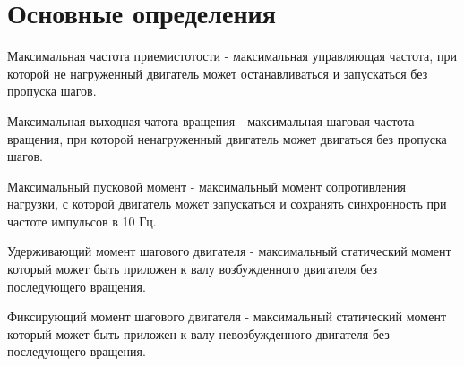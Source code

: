 \newpage
\part{ Основные определения }

Максимальная частота приемистотости - максимальная управляющая частота, при которой не нагруженный
двигатель может останавливаться и запускаться без пропуска шагов.

Максимальная выходная чатота вращения - максимальная шаговая частота вращения, при которой
ненагруженный двигатель может двигаться без пропуска шагов.

Максимальный пусковой момент - максимальный момент сопротивления нагрузки, с которой двигатель может
запускаться и сохранять синхронность при частоте импульсов в 10 Гц.

Удерживающий момент шагового двигателя - максимальный статический момент который может быть приложен
к валу возбужденного двигателя без последующего вращения. 

Фиксирующий момент шагового двигателя - максимальный статический момент который может быть приложен
к валу невозбужденного двигателя без последующего вращения. 

